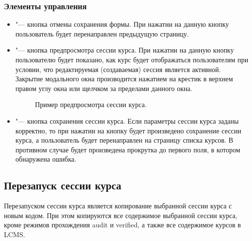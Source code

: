 \subsubsection{Элементы управления}
\begin{itemize}
	\item {} "--- кнопка отмены сохранения формы. При нажатии на данную кнопку пользователь будет перенаправлен предыдущую страницу.
	\item {} "--- кнопка предпросмотра сессии курса. При нажатии на данную кнопку пользователю будет показано, как курс будет отображаться пользователям при условии, что редактируемая (создаваемая) сессия является активной. Закрытие модального окна производится нажатием на крестик в верхнем правом углу окна или щелчком за пределами данного окна.
	\begin{figure}[H]
		\caption{Пример предпросмотра сессии курса.}
		\label{img:course_session:course_session_preview}
	\end{figure}
	
	\item {} "--- кнопка сохранения сессии курса. Если параметры сессии курса заданы корректно, то при нажатии на кнопку будет произведено сохранение сессии курса, а пользователь будет перенаправлен на страницу списка курсов. В противном случае будет произведена прокрутка до первого поля, в котором обнаружена ошибка.
\end{itemize}

\subsection{Перезапуск сессии курса}
Перезапуском сессии курса является копирование выбранной сессии курса с новым кодом.
При этом копируются все  содержимое выбранной сессии курса, кроме режимов прохождения audit и verified, а также все содержимое курсов в LCMS.

